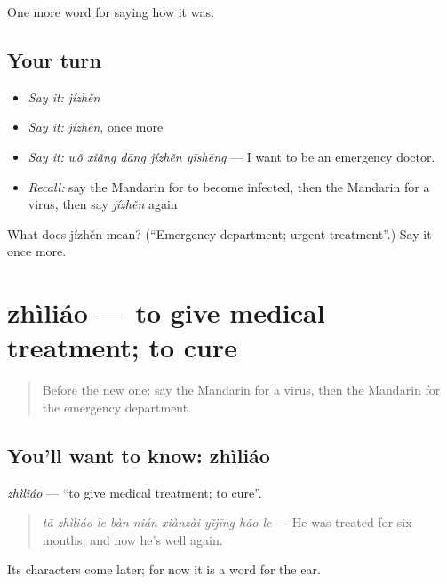 \begin{grammarlens}[title={What you've built}]
One more word for saying how it was.
\end{grammarlens}

\subsection*{Your turn}
\begin{itemize}
\raggedright
  \item \emph{Say it:} \emph{jízhěn}
  \item \emph{Say it:} \emph{jízhěn}, once more
  \item \emph{Say it:} \emph{wǒ xiǎng dāng jízhěn yīshēng} — I want to be an emergency doctor.
  \item \emph{Recall:} say the Mandarin for to become infected, then the Mandarin for a virus, then say \emph{jízhěn} again
\end{itemize}

\begin{tcolorbox}[breakable,colback=teal!4,colframe=teal!35!black,title={Before you move on}]
What does jízhěn mean? (\textquotedblleft{}Emergency department; urgent treatment\textquotedblright{}.) Say it once more.
\end{tcolorbox}
\section[zhìliáo]{zhìliáo — to give medical treatment; to cure}

\label{lesson:ZH-C482-zhiliao}



\begin{quote}
Before the new one: say the Mandarin for a virus, then the Mandarin for the emergency department.
\end{quote}

\subsection*{You'll want to know: zhìliáo}
\emph{zhìliáo} — \textquotedblleft{}to give medical treatment; to cure\textquotedblright{}.

\begin{quote}
\emph{tā zhìliáo le bàn nián xiànzài yǐjīng hǎo le} — He was treated for six months, and now he's well again.
\end{quote}

Its characters come later; for now it is a word for the ear.

